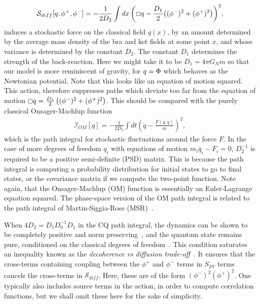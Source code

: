 \documentclass[aps,preprintnumbers,superscriptaddress,longbibliography]{revtex4-1}
\begin{document}
\begin{align}
    \mathcal{S}_{diff}[q,\phi^+,\phi^-]=-\frac{1}{2D_2}\int dx\, \bigg(\Box q-\frac{D_1}{2}\big((\phi^-)^2 +(\phi^+)^2\big)\bigg)^2,
    \label{eq:boxq}
\end{align}
induces a stochastic force on the classical field $q(x)$, by an amount determined by the average mass density of the bra and ket fields at some point $x$, and whose variance is determined by the constant $D_2$. The constant $D_1$ determines the strength of the back-reaction. Here we might take it to be $D_1=4\pi G_N m$ so that our model is more reminiscent of gravity, for $q=\Phi$ which behaves as the Newtonian potential. Note that this looks like an equation of motion squared. This action, therefore suppresses paths which deviate too far from the equation of motion $\Box q=\frac{D_1}{2}\left((\phi^-)^2 +(\phi^+)^2\right)$. This should be compared with the purely classical Onsager-Machlup function
\begin{align}
    \mathcal{I}_{OM}[q]=-\frac{1}{2D_2}\int dt\left(\ddot{q}-\frac{F(q,\dot{q})}{m}\right)^2,
    \label{eq:OM}
\end{align}
which is the path integral for stochastic fluctuations around the force $F$. In the case of more degrees of freedom $q_i$ with equations of motion $m_i\ddot{q_i}-F_i=0$, $D_2^{-1}$ is required to be a positive semi-definite (PSD) matrix. This is because the path integral is computing a probability distribution for initial states to go to final states, or the covariance matrix if we compute the two-point function. Note again, that the Onsager-Machlup (OM) function is essentially an Euler-Lagrange equation squared. The phase-space version of the OM path integral is related to the path integral of Martin-Siggia-Rose (MSR)~\cite{martin1973statistical}.



When $4D_2=D_1D_0^{-1}D_1$ in the CQ path integral, the dynamics can be shown to be completely positive and norm preserving~\cite{oppenheim2023covariant}, and the quantum state remains pure, conditioned on the classical degrees of freedom~\cite{layton2022semi}. This condition saturates an inequality known as the {\it decoherence vs diffusion trade-off}~\cite{oppenheim2022gravitationally}. It ensures that the  cross-terms containing coupling between the $\phi^+$ and $\phi^-$ terms in $S_{FV}$ terms cancels the cross-terms in $\mathcal{S}_{diff}$. Here, these are of the form $(\phi^-)^2(\phi^+)^2$.
One typically also includes source terms in the action, in order to compute correlation functions, but we shall omit these here for the sake of simplicity.
\end{document}
